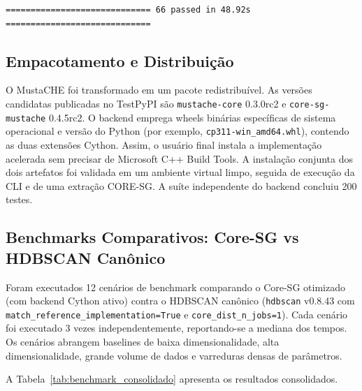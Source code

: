 \documentclass[12pt,a4paper,oneside]{article}
\begin{document}
\begin{verbatim}
============================= 66 passed in 48.92s =============================
\end{verbatim}

\subsection{Empacotamento e Distribuição}

O MustaCHE foi transformado em um pacote redistribuível. As versões candidatas publicadas no
TestPyPI são \texttt{mustache-core} 0.3.0rc2 e \texttt{core-sg-mustache} 0.4.5rc2. O backend
emprega wheels binárias específicas de sistema operacional e versão do Python
(por exemplo, \texttt{cp311-win\_amd64.whl}), contendo as duas extensões Cython. Assim, o
usuário final instala a implementação acelerada sem precisar de Microsoft C++ Build Tools. A
instalação conjunta dos dois artefatos foi validada em um ambiente virtual limpo, seguida de
execução da CLI e de uma extração CORE-SG. A suíte independente do backend concluiu 200 testes.

\subsection{Benchmarks Comparativos: Core-SG vs HDBSCAN Canônico}

Foram executados 12 cenários de benchmark comparando o Core-SG otimizado (com backend Cython
ativo) contra o HDBSCAN canônico (\texttt{hdbscan} v0.8.43 com
\texttt{match\_reference\_implementation=True} e \texttt{core\_dist\_n\_jobs=1}). Cada cenário
foi executado 3 vezes independentemente, reportando-se a mediana dos tempos. Os cenários
abrangem baselines de baixa dimensionalidade, alta dimensionalidade, grande volume de dados e
varreduras densas de parâmetros.

A Tabela~\ref{tab:benchmark_consolidado} apresenta os resultados consolidados.
\end{document}
